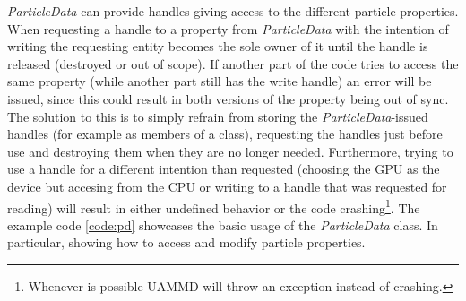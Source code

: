 \documentclass[ twoside,openright,titlepage,numbers=noenddot,%
headinclude,footinclude,cleardoublepage=empty,abstract=on,
BCOR=5mm,paper=a4,fontsize=11pt, dvipsnames
]{scrreprt}
\newcommand{\uammd}{\gls{UAMMD}\xspace}
\begin{document}
\emph{ParticleData} can provide handles giving access to the different particle properties.
When requesting a handle to a property from \emph{ParticleData} with the intention of writing the requesting entity becomes the sole owner of it until the handle is released (destroyed or out of scope). If another part of the code tries to access the same property (while another part still has the write handle) an error will be issued, since this could result in both versions of the property being out of sync. The solution to this is to simply refrain from storing the \emph{ParticleData}-issued handles (for example as members of a class), requesting the handles just before use and destroying them when they are no longer needed. Furthermore, trying to use a handle for a different intention than requested (choosing the GPU as the device but accesing from the CPU or writing to a handle that was requested for reading) will result in either undefined behavior or the code crashing\footnote{Whenever is possible \uammd will throw an exception instead of crashing.}. The example code \ref{code:pd} showcases the basic usage of the \emph{ParticleData} class. In particular, showing how to access and modify particle properties.
\end{document}
